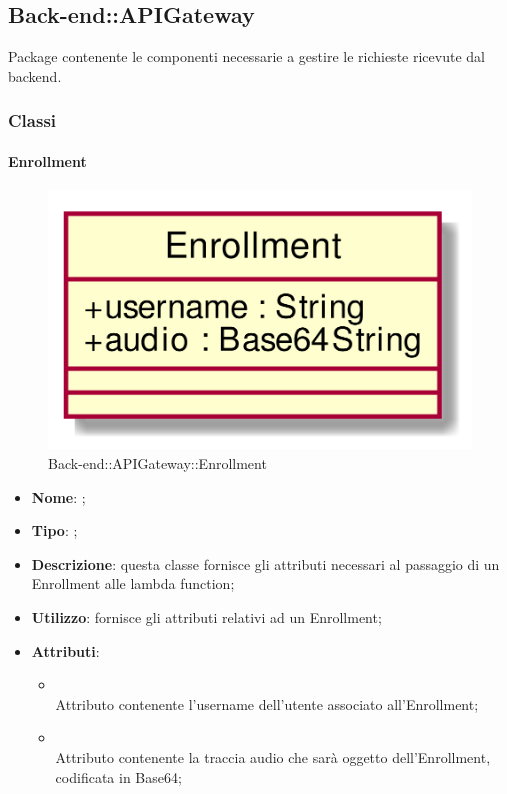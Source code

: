 \subsection{Back-end::APIGateway}
Package contenente le componenti necessarie a gestire le richieste ricevute dal backend.
\subsubsection{Classi}
\hypertarget{Enrollment_label}{\paragraph{Enrollment}}
\begin{figure}[h]
	\centering
	\includegraphics[width=\textwidth,height=\textheight,keepaspectratio]{images/ClassEnrollment.png}
	\caption{Back-end::APIGateway::Enrollment}
\end{figure}
\begin{itemize}
	\item \textbf{Nome}: ;
	\item \textbf{Tipo}: ;
	\item \textbf{Descrizione}: questa classe fornisce gli attributi necessari al passaggio di un Enrollment alle lambda function;
	\item \textbf{Utilizzo}: fornisce gli attributi relativi ad un Enrollment;
	\item \textbf{Attributi}:
	\begin{itemize}
		\item[]  \\
		Attributo contenente l'username dell'utente associato all'Enrollment;
		\item[]  \\
		Attributo contenente la traccia audio che sarà oggetto dell'Enrollment, codificata in Base64;
	\end{itemize}
\end{itemize}
\FloatBarrier

